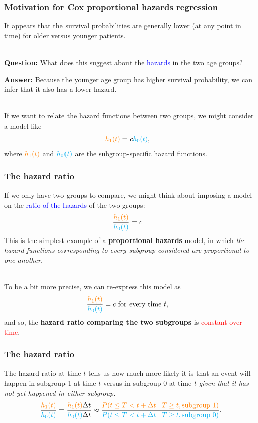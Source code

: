 \documentclass[10pt,t]{beamer}
\begin{document}
\begin{frame}
\frametitle{Motivation for Cox proportional hazards regression}

It appears that the survival probabilities are generally lower (at any point in time) for older versus younger patients. 
\\ ~\ 

\textbf{Question:} What does this suggest about the \textcolor{blue}{hazards} in the two age groups? \pause

\textbf{Answer:} Because the younger age group has higher survival probability, we can infer that it also has a lower hazard. 
\\ ~\ 

If we want to relate the hazard functions between two groups, we might consider a model like
\begin{align*}
\textcolor{orange}{h_1(t)} &= c\textcolor{cyan}{h_0(t)},
\end{align*}
where $\textcolor{orange}{h_1(t)}$ and $\textcolor{cyan}{h_0(t)}$ are the subgroup-specific hazard functions.
\end{frame}

\begin{frame}
\frametitle{The hazard ratio}
If we only have two groups to compare, we might think about imposing a model on the \textcolor{blue}{ratio of the hazards} of the two groups:
\begin{align*}
\frac{\textcolor{orange}{h_1(t)}}{\textcolor{cyan}{h_0(t)}} &= c
\end{align*}
This is the simplest example of a \textbf{proportional hazards} model, in which \textit{the hazard functions corresponding to every subgroup considered are proportional to one another.}
\\ ~\ 

To be a bit more precise, we can re-express this model as
\begin{align*}
\frac{\textcolor{orange}{h_1(t)}}{\textcolor{cyan}{h_0(t)}} &= c \text{ for every time } t,
\end{align*}
and so, the \textbf{hazard ratio comparing the two subgroups} is \textcolor{red}{constant over time}.

\end{frame}

\begin{frame}
\frametitle{The hazard ratio}
The hazard ratio at time $t$ tells us how much more likely it is that an event will happen in subgroup 1 at time $t$ versus in subgroup 0 at time $t$ \textit{given that it has not yet happened in either subgroup.}
\begin{align*}
\frac{\textcolor{orange}{h_1(t)}}{\textcolor{cyan}{h_0(t)}} = \frac{\textcolor{orange}{h_1(t)}\Delta t}{\textcolor{cyan}{h_0(t)}\Delta t} \approx \frac{\textcolor{orange}{P(t \leq T < t + \Delta t \mid T \geq t, \text{subgroup }1)}}{\textcolor{cyan}{P(t \leq T < t + \Delta t \mid T \geq t, \text{subgroup }0)}}.
\end{align*}

\end{frame}
\end{document}
